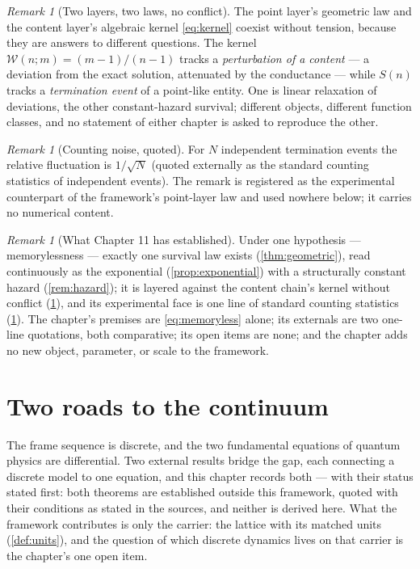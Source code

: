\documentclass[11pt]{amsbook}
\theoremstyle{plain}
\theoremstyle{definition}
\theoremstyle{remark}
\newtheorem{remark}[theorem]{Remark}
\begin{document}
\begin{remark}[Two layers, two laws, no conflict]\label{rem:two-layers-decay}
The point layer's geometric law and the content layer's algebraic kernel \cref{eq:kernel} coexist without tension, because they are answers to different questions. The kernel $\mathcal{W}(n;m) = (m-1)/(n-1)$ tracks a \emph{perturbation of a content} --- a deviation from the exact solution, attenuated by the conductance --- while $S(n)$ tracks a \emph{termination event} of a point-like entity. One is linear relaxation of deviations, the other constant-hazard survival; different objects, different function classes, and no statement of either chapter is asked to reproduce the other.
\end{remark}

\begin{remark}[Counting noise, quoted]\label{rem:counting-noise}
For $N$ independent termination events the relative fluctuation is $1/\sqrt{N}$ (quoted externally as the standard counting statistics of independent events). The remark is registered as the experimental counterpart of the framework's point-layer law and used nowhere below; it carries no numerical content.
\end{remark}

\begin{remark}[What Chapter 11 has established]\label{rem:ch11summary}
Under one hypothesis --- memorylessness --- exactly one survival law exists (\cref{thm:geometric}), read continuously as the exponential (\cref{prop:exponential}) with a structurally constant hazard (\cref{rem:hazard}); it is layered against the content chain's kernel without conflict (\cref{rem:two-layers-decay}), and its experimental face is one line of standard counting statistics (\cref{rem:counting-noise}). The chapter's premises are \cref{eq:memoryless} alone; its externals are two one-line quotations, both comparative; its open items are none; and the chapter adds no new object, parameter, or scale to the framework.
\end{remark}

\chapter{Two roads to the continuum}\label{ch:limits}

The frame sequence is discrete, and the two fundamental equations of quantum physics are differential. Two external results bridge the gap, each connecting a discrete model to one equation, and this chapter records both --- with their status stated first: both theorems are established outside this framework, quoted with their conditions as stated in the sources, and neither is derived here. What the framework contributes is only the carrier: the lattice with its matched units (\cref{def:units}), and the question of which discrete dynamics lives on that carrier is the chapter's one open item.
\end{document}
